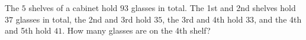 The $5$ shelves of a cabinet hold $93$ glasses in total. The 1st and 2nd shelves hold $37$ glasses in total, the 2nd and 3rd hold $35$, the 3rd and 4th hold $33$, and the 4th and 5th hold $41$. How many glasses are on the 4th shelf?

